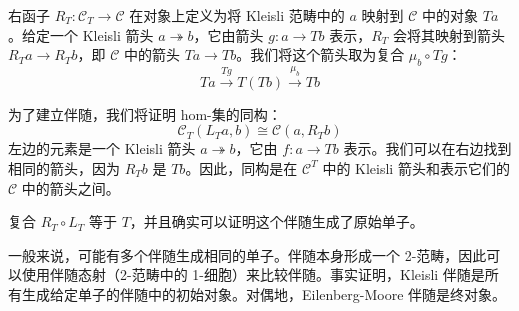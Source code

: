 \documentclass[DaoFP]{subfiles}
\begin{document}
右函子 $R_T \colon \mathcal{C}_T \to \mathcal{C}$ 在对象上定义为将 Kleisli 范畴中的 $a$ 映射到 $\mathcal{C}$ 中的对象 $T a$。给定一个 Kleisli 箭头 $a \twoheadrightarrow b$，它由箭头 $g \colon a \to T b$ 表示，$R_T$ 会将其映射到箭头 $R_T a \to R_T b$，即 $\mathcal{C}$ 中的箭头 $T a \to T b$。我们将这个箭头取为复合 $\mu_b \circ T g$：
\[  T a \xrightarrow{T g} T(T b) \xrightarrow{\mu_b} T b\]

为了建立伴随，我们将证明 hom-集的同构：
\[\mathcal{C}_T(L_T a, b) \cong \mathcal{C}(a, R_T b)\]
左边的元素是一个 Kleisli 箭头 $a \twoheadrightarrow b$，它由 $f \colon a \to T b$ 表示。我们可以在右边找到相同的箭头，因为 $R_T b$ 是 $T b$。因此，同构是在 $\mathcal{C}^T$ 中的 Kleisli 箭头和表示它们的 $\mathcal{C}$ 中的箭头之间。

复合 $R_T \circ L_T$ 等于 $T$，并且确实可以证明这个伴随生成了原始单子。

一般来说，可能有多个伴随生成相同的单子。伴随本身形成一个 2-范畴，因此可以使用伴随态射（2-范畴中的 1-细胞）来比较伴随。事实证明，Kleisli 伴随是所有生成给定单子的伴随中的初始对象。对偶地，Eilenberg-Moore 伴随是终对象。
\end{document}
